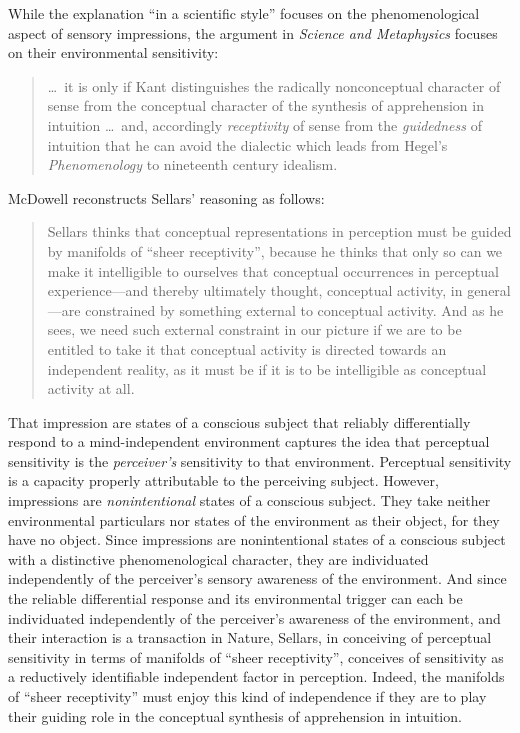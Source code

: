 \documentclass[12pt]{article}
\begin{document}
While the explanation ``in a scientific style'' focuses on the phenomenological aspect of sensory impressions, the argument in \emph{Science and Metaphysics} focuses on their environmental sensitivity:
\begin{quote}
    \ldots\ it is only if Kant distinguishes the radically nonconceptual character of sense from the conceptual character of the synthesis of apprehension in intuition \ldots\ and, accordingly \emph{receptivity} of sense from the \emph{guidedness} of intuition that he can avoid the dialectic which leads from Hegel's \emph{Phenomenology} to nineteenth century idealism. \citep[16]{Sellars:1967uq}
\end{quote}
McDowell reconstructs Sellars' reasoning as follows:
\begin{quote}
    Sellars thinks that conceptual representations in perception must be guided by manifolds of ``sheer receptivity'', because he thinks that only so can we make it intelligible to ourselves that conceptual occurrences in perceptual experience---and thereby ultimately thought, conceptual activity, in general---are constrained by something external to conceptual activity. And as he sees, we need such external constraint in our picture if we are to be entitled to take it that conceptual activity is directed towards an independent reality, as it must be if it is to be intelligible as conceptual activity at all. \citep[46]{McDowell:1998vn}
\end{quote}

That impression are states of a conscious subject that reliably differentially respond to a mind-independent environment captures the idea that perceptual sensitivity is the \emph{perceiver's} sensitivity to that environment. Perceptual sensitivity is a capacity properly attributable to the perceiving subject. However, impressions are \emph{nonintentional} states of a conscious subject. They take neither environmental particulars nor states of the environment as their object, for they have no object. Since impressions are nonintentional states of a conscious subject with a distinctive phenomenological character, they are individuated independently of the perceiver's sensory awareness of the environment. And since the reliable differential response and its environmental trigger can each be individuated independently of the perceiver's awareness of the environment, and their interaction is a transaction in Nature, Sellars, in conceiving of perceptual sensitivity in terms of manifolds of ``sheer receptivity'', conceives of sensitivity as a reductively identifiable independent factor in perception. Indeed, the manifolds of ``sheer receptivity'' must enjoy this kind of independence if they are to play their guiding role in the conceptual synthesis of apprehension in intuition.
\end{document}
